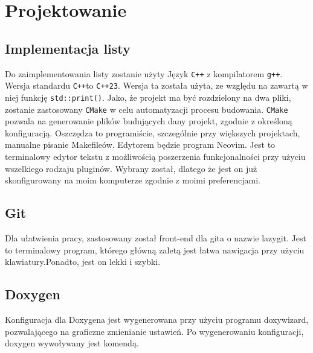 	\newpage
\section{Projektowanie}		%

\subsection{Implementacja listy}

Do zaimplementowania listy zostanie użyty Język \texttt{C++} z kompilatorem \texttt{g++}. Wersja standardu \texttt{C++}to \texttt{C++23}. Wersja ta została użyta, ze względu na zawartą w niej funkcję \texttt{std::print()}. Jako, że projekt ma być rozdzielony na dwa pliki, zostanie zastosowany \texttt{CMake} w celu automatyzacji procesu budowania. \texttt{CMake} pozwala na generowanie plików budujących dany projekt, zgodnie z określoną konfiguracją. Oszczędza to programiście, szczególnie przy większych projektach, manualne pisanie Makefileów. Edytorem będzie program Neovim. Jest to terminalowy edytor tekstu z możliwością poszerzenia funkcjonalności przy użyciu wszelkiego rodzaju pluginów. Wybrany został, dlatego że jest on już skonfigurowany na moim komputerze zgodnie z moimi preferencjami. 

\subsection{Git}

Dla ułatwienia pracy, zastosowany został front-end dla gita o nazwie lazygit. Jest to terminalowy program, którego główną zaletą jest łatwa nawigacja przy użyciu klawiatury.Ponadto, jest on lekki i szybki.

\subsection{Doxygen}

Konfiguracja dla Doxygena jest wygenerowana przy użyciu programu doxywizard, pozwalającego na graficzne zmienianie ustawień. Po wygenerowaniu konfiguracji, doxygen wywoływany jest komendą. 
